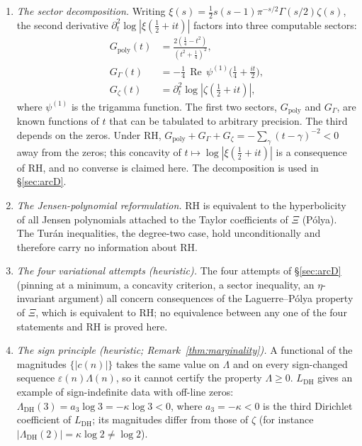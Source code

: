 \documentclass[11pt]{amsart}
\theoremstyle{definition}
\theoremstyle{remark}
\theoremstyle{definition}
\renewcommand{\Re}{\operatorname{Re}}
\begin{document}
\begin{enumerate}[label=(\roman*),leftmargin=2.2em]
\item \emph{The sector decomposition.} Writing $\xi(s)=\tfrac12 s(s-1)\pi^{-s/2}\Gamma(s/2)\zeta(s)$, the
second derivative $\partial_t^2\log|\xi(\tfrac12+it)|$ factors into three computable sectors:
\begin{align}
   G_{\mathrm{poly}}(t) &= \frac{2(\tfrac14-t^2)}{(t^2+\tfrac14)^2},\label{eq:gpoly2}\\
   G_\Gamma(t) &= -\tfrac14\,\Re\,\psi^{(1)}\!\bigl(\tfrac14+\tfrac{it}{2}\bigr),\label{eq:ggamma2}\\
   G_\zeta(t) &= \partial_t^2\log|\zeta(\tfrac12+it)|,\label{eq:gzeta2}
\end{align}
where $\psi^{(1)}$ is the trigamma function. The first two sectors, $G_{\mathrm{poly}}$ and $G_\Gamma$,
are known functions of $t$ that can be tabulated to arbitrary precision. The third depends on the zeros.
Under RH, $G_{\mathrm{poly}}+G_\Gamma+G_\zeta=-\sum_\gamma(t-\gamma)^{-2}<0$ away from the zeros; this
concavity of $t\mapsto\log|\xi(\tfrac12+it)|$ is a consequence of RH, and no converse is claimed here.
The decomposition is used in \S\ref{sec:arcD}.

\item \emph{The Jensen-polynomial reformulation.} RH is equivalent to the hyperbolicity of all Jensen
polynomials attached to the Taylor coefficients of $\Xi$ (P\'olya). The Tur\'an inequalities, the
degree-two case, hold unconditionally \cite{CsordasNorfolkVarga1986} and therefore carry no information
about RH.

\item \emph{The four variational attempts (heuristic).} The four attempts of \S\ref{sec:arcD}
(pinning at a minimum, a concavity criterion, a sector inequality, an $\eta$-invariant argument) all
concern consequences of the Laguerre--P\'olya property of $\Xi$, which is equivalent to RH; no
equivalence between any one of the four statements and RH is proved here.

\item \emph{The sign principle (heuristic; Remark~\ref{thm:marginality}).} A functional of the
magnitudes $\{|c(n)|\}$ takes the same value on $\Lambda$ and on every sign-changed sequence
$\varepsilon(n)\Lambda(n)$, so it cannot certify the property $\Lambda\ge0$. $L_{\mathrm{DH}}$ gives an
example of sign-indefinite data with off-line zeros: $\Lambda_{\mathrm{DH}}(3)=a_3\log3=-\kappa\log3<0$,
where $a_3=-\kappa<0$ is the third Dirichlet coefficient of $L_{\mathrm{DH}}$; its magnitudes differ from
those of $\zeta$ (for instance $|\Lambda_{\mathrm{DH}}(2)|=\kappa\log2\ne\log2$).


\end{enumerate}
\end{document}
